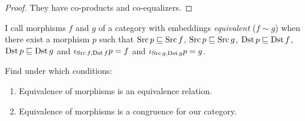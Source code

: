 \begin{proof}
  They have co-products and co-equalizers.
\end{proof}

\begin{defn}
  I call morphisms $f$ and $g$ of a category with embeddings
  \emph{equivalent} ($f \sim g$) when there exist a morphism $p$ such that
  $\operatorname{Src} p \sqsubseteq \operatorname{Src} f$, $\operatorname{Src} p \sqsubseteq
  \operatorname{Src} g$, $\operatorname{Dst} p \sqsubseteq \operatorname{Dst} f$, $\operatorname{Dst} p
  \sqsubseteq \operatorname{Dst} g$ and $\iota_{\operatorname{Src} f, \operatorname{Dst} f} p = f$ and
  $\iota_{\operatorname{Src} g, \operatorname{Dst} g} p = g$.
\end{defn}

\begin{problem}
  Find under which conditions:
  \begin{enumerate}
    \item Equivalence of morphisms is an equivalence relation.
    
    \item Equivalence of morphisms is a congruence for our category.
  \end{enumerate}
\end{problem}